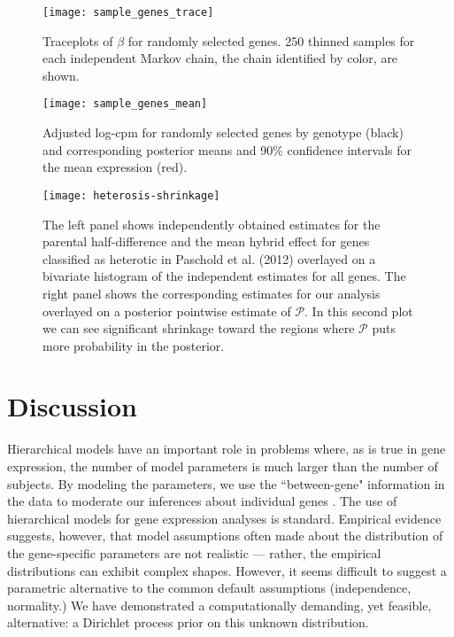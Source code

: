 \begin{itemize}
{\begin{figure}
\texttt{[image: sample\_genes\_trace]}
\begin{minipage}{.8\textwidth}
\caption{Traceplots of $\beta$ for randomly selected genes. 250 thinned samples for each independent Markov chain, the chain identified by color, are shown.}
\label{mixing}
\end{minipage}
\end{figure}

\begin{figure}
\texttt{[image: sample\_genes\_mean]}
\begin{minipage}{.8\textwidth}
\caption{Adjusted log-cpm for randomly selected genes by genotype (black) and corresponding posterior means and 90\% confidence intervals for the mean expression (red).}
\label{compare-cis}
\end{minipage}
\end{figure}
}





\begin{figure}[h!]
\centering
\texttt{[image: heterosis-shrinkage]}
\begin{minipage}{.8\textwidth}
\caption{\small The left panel shows independently obtained estimates for the parental half-difference and the mean hybrid effect for genes classified as heterotic in Paschold et al. (2012) overlayed on a bivariate histogram of the independent estimates for all genes. The right
panel shows the corresponding estimates for our analysis overlayed on a posterior pointwise estimate of $\mathcal{P}$. In this second plot we can see significant shrinkage toward the regions where $\mathcal{P}$ puts more probability in the posterior.}
\label{het-shrink}
\end{minipage}
\end{figure}

\section{Discussion}
\label{sec:discussion}
Hierarchical models have an important role in problems where, as is true in gene expression, the number of model parameters is much larger than the number of subjects. By modeling the parameters, we use the ``between-gene" information in the data to moderate our inferences about individual genes . The use of hierarchical models for gene expression analyses is standard. Empirical evidence suggests, however, that model assumptions often made about the distribution of the gene-specific parameters are not realistic --- rather, the empirical distributions can exhibit complex shapes. However, it seems difficult to suggest a parametric alternative to the common default assumptions (independence, normality.) We have demonstrated a computationally demanding, yet feasible, alternative: a Dirichlet process prior on this unknown distribution.


\end{itemize}
